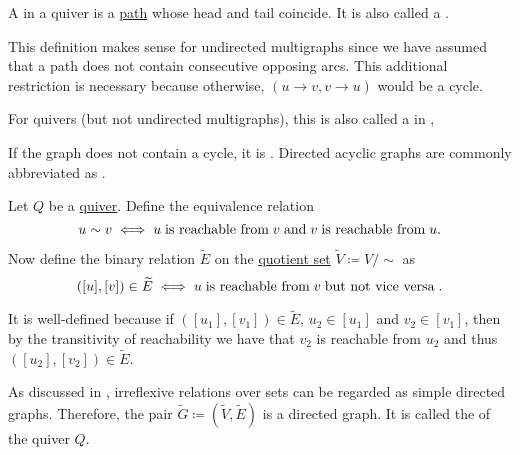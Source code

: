 \begin{definition}\label{def:quiver_cycle}
  A  in a quiver is a \hyperref[def:quiver_directed_path]{path} whose head and tail coincide. It is also called a .

  This definition makes sense for undirected multigraphs since we have assumed that a path does not contain consecutive opposing arcs. This additional restriction is necessary because otherwise, \( (u \to v, v \to u) \) would be a cycle.

  For quivers (but not undirected multigraphs), this is also called a  in \cite[ch. 1, sec. 1.4]{GondranMinoux1984Graphs},

  If the graph does not contain a cycle, it is . Directed acyclic graphs are commonly abbreviated as .
\end{definition}

\begin{definition}\label{def:quiver_condensation}
  Let \( Q \) be a \hyperref[def:graph/quiver]{quiver}. Define the equivalence relation
  \begin{equation*}
    u \sim v \iff u \T{is reachable from} v \T{and} v \T{is reachable from} u.
  \end{equation*}

  Now define the binary relation \( \widetilde{E} \) on the \hyperref[def:equivalence_relation/quotient]{quotient set} \( \widetilde{V} \coloneqq V / {\sim} \) as
  \begin{equation*}
    ([u], [v]) \in \widetilde{E} \iff u \T{is reachable from} v \T{but not vice versa}.
  \end{equation*}

  It is well-defined because if \( ([u_1], [v_1]) \in \widetilde{E} \), \( u_2 \in [u_1] \) and \( v_2 \in [v_1] \), then by the transitivity of reachability we have that \( v_2 \) is reachable from \( u_2 \) and thus \( ([u_2], [v_2]) \in \widetilde{E} \).

  As discussed in , irreflexive relations over sets can be regarded as simple directed graphs. Therefore, the pair \( \widetilde{G} \coloneqq (\widetilde{V}, \widetilde{E}) \) is a directed graph. It is called the  of the quiver \( Q \).
\end{definition}

